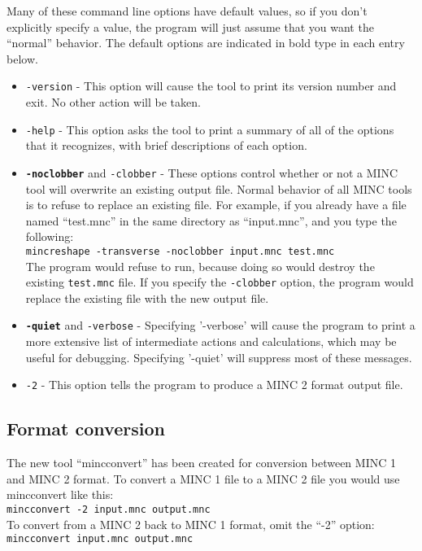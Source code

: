 \documentclass{article}
\begin{document}
Many of these command line options have default values, so if you 
don't explicitly specify a value, the program will just assume that
you want the ``normal'' behavior.  The default options are indicated
in bold type in each entry below.

\begin{itemize}
\item {\tt -version} - This option will cause the tool to print its
version number and exit.  No other action will be taken.
\item{\tt -help} - This option asks the tool to print a 
summary of all of the options that it recognizes, with brief descriptions
of each option.
\item \texttt{\textbf{-noclobber}} and {\tt -clobber} - These options control
whether or not a MINC tool will overwrite an existing output file.
Normal behavior of all MINC tools is to refuse to replace an existing
file.  For example, if you already have a file named ``test.mnc'' in
the same directory as ``input.mnc'', and you type the following:\\

\mbox{\tt mincreshape -transverse -noclobber input.mnc test.mnc}\\

The program would refuse to run, because doing so would destroy the
existing {\tt test.mnc} file.  If you specify the {\tt -clobber} option, the
program would replace the existing file with the new output file.

\item \texttt{\textbf{-quiet}} and {\tt -verbose} - Specifying
'-verbose' will cause the program to print a more extensive list of
intermediate actions and calculations, which may be useful for
debugging.  Specifying '-quiet' will suppress most of these messages.

\item \texttt{-2} - This option tells the program to produce a MINC 2
format output file.

\end{itemize}

\subsection{Format conversion}
The new tool ``mincconvert'' has been created for conversion between
MINC 1 and MINC 2 format.  To convert a MINC 1 file to a MINC 2 file you
would use mincconvert like this:\\
\mbox{\tt mincconvert -2 input.mnc output.mnc} \\
To convert from a MINC 2 back to MINC 1 format, omit the ``-2'' option: \\
\mbox{\tt mincconvert input.mnc output.mnc}
\end{document}
